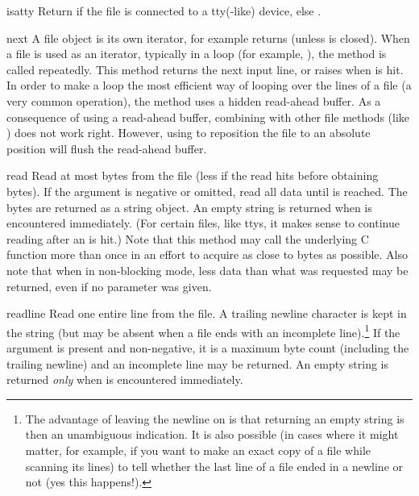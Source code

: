 \begin{methoddesc}[file]{isatty}{}
  Return  if the file is connected to a tty(-like) device, else
  .  
\end{methoddesc}

\begin{methoddesc}[file]{next}{}
A file object is its own iterator, for example  returns
 (unless  is closed).  When a file is used as an
iterator, typically in a  loop (for example,
), the  method is
called repeatedly.  This method returns the next input line, or raises
 when \EOF{} is hit.  In order to make a
 loop the most efficient way of looping over the lines of
a file (a very common operation), the  method uses a
hidden read-ahead buffer.  As a consequence of using a read-ahead
buffer, combining  with other file methods (like
) does not work right.  However, using
 to reposition the file to an absolute position will
flush the read-ahead buffer.
\end{methoddesc}

\begin{methoddesc}[file]{read}{}
  Read at most  bytes from the file (less if the read hits
  \EOF{} before obtaining  bytes).  If the 
  argument is negative or omitted, read all data until \EOF{} is
  reached.  The bytes are returned as a string object.  An empty
  string is returned when \EOF{} is encountered immediately.  (For
  certain files, like ttys, it makes sense to continue reading after
  an \EOF{} is hit.)  Note that this method may call the underlying
  C function  more than once in an effort to
  acquire as close to  bytes as possible. Also note that
  when in non-blocking mode, less data than what was requested may
  be returned, even if no  parameter was given.
\end{methoddesc}

\begin{methoddesc}[file]{readline}{}
  Read one entire line from the file.  A trailing newline character is
  kept in the string (but may be absent when a file ends with an
  incomplete line).\footnote{
	The advantage of leaving the newline on is that
	returning an empty string is then an unambiguous \EOF{}
	indication.  It is also possible (in cases where it might
	matter, for example, if you
	want to make an exact copy of a file while scanning its lines)
	to tell whether the last line of a file ended in a newline
	or not (yes this happens!).
  }  If the  argument is present and
  non-negative, it is a maximum byte count (including the trailing
  newline) and an incomplete line may be returned.
  An empty string is returned \emph{only} when \EOF{} is encountered
  immediately.  
\end{methoddesc}


